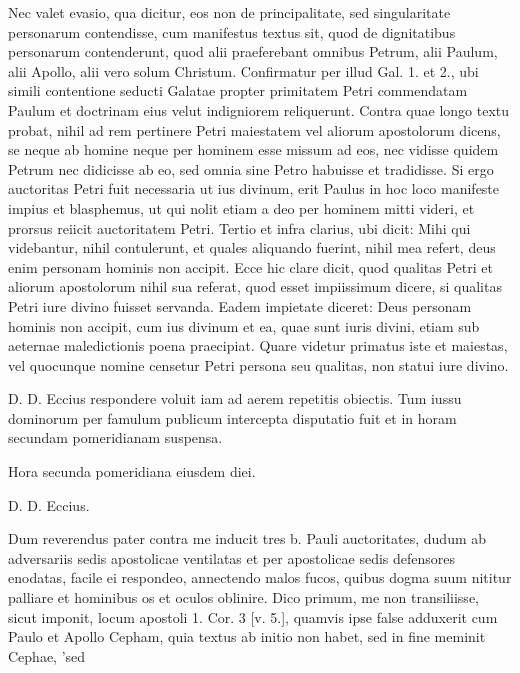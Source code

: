 Nec valet evasio, qua dicitur, eos non de principalitate, sed singularitate personarum contendisse, cum manifestus textus sit, quod de dignitatibus personarum contenderunt, quod alii praeferebant omnibus Petrum, alii Paulum, alii Apollo, alii vero solum Christum. Confirmatur per illud Gal. 1. et 2., ubi simili contentione seducti Galatae propter primitatem Petri commendatam Paulum et doctrinam eius velut indigniorem reliquerunt. Contra quae longo textu probat, nihil ad rem pertinere Petri maiestatem vel aliorum apostolorum dicens, se neque ab homine neque per hominem esse missum ad eos, nec vidisse quidem Petrum nec didicisse ab eo, sed omnia sine Petro habuisse et tradidisse. Si ergo auctoritas Petri fuit necessaria ut ius divinum, erit Paulus in hoc loco manifeste impius et blasphemus, ut qui nolit etiam a deo per hominem mitti videri, et prorsus reiicit auctoritatem Petri. Tertio et infra clarius, ubi dicit: Mihi qui videbantur, nihil contulerunt, et quales aliquando fuerint, nihil mea refert, deus enim personam hominis non accipit. Ecce hic clare dicit, quod qualitas Petri et aliorum apostolorum nihil sua referat, quod esset impiissimum dicere, si qualitas Petri iure divino fuisset servanda. Eadem impietate diceret: Deus personam hominis non accipit, cum ius divinum et ea, quae sunt iuris divini, etiam sub aeternae maledictionis poena praecipiat. Quare videtur primatus iste et maiestas, vel quocunque nomine censetur Petri persona seu qualitas, non statui iure divino.

D. D. Eccius respondere voluit iam ad aerem repetitis obiectis. Tum iussu dominorum per famulum publicum intercepta disputatio fuit et in horam secundam pomeridianam suspensa.

Hora secunda pomeridiana eiusdem diei.

D. D. Eccius.

Dum reverendus pater contra me inducit tres b. Pauli auctoritates, dudum ab adversariis sedis apostolicae ventilatas et per apostolicae sedis defensores enodatas, facile ei respondeo, annectendo malos fucos, quibus dogma suum nititur palliare et hominibus os et oculos oblinire. Dico primum, me non transiliisse, sicut imponit, locum apostoli 1. Cor. 3 [v. 5.], quamvis ipse false adduxerit cum Paulo et Apollo Cepham, quia textus ab initio non habet, sed in fine meminit Cephae, 'sed

